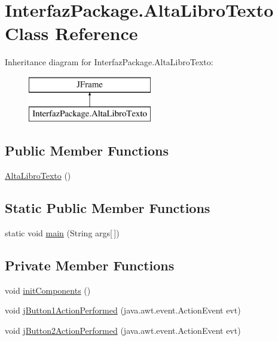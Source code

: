 \hypertarget{class_interfaz_package_1_1_alta_libro_texto}{}\section{Interfaz\+Package.\+Alta\+Libro\+Texto Class Reference}
\label{class_interfaz_package_1_1_alta_libro_texto}
Inheritance diagram for Interfaz\+Package.\+Alta\+Libro\+Texto\+:\begin{figure}[H]
\begin{center}
\leavevmode
\includegraphics[height=2.000000cm]{class_interfaz_package_1_1_alta_libro_texto}
\end{center}
\end{figure}
\subsection*{Public Member Functions}
\begin{DoxyCompactItemize}
\item 
\mbox{\hyperlink{class_interfaz_package_1_1_alta_libro_texto_a345a50ec50122a4c6b44dfb0f33a316b}{Alta\+Libro\+Texto}} ()
\end{DoxyCompactItemize}
\subsection*{Static Public Member Functions}
\begin{DoxyCompactItemize}
\item 
static void \mbox{\hyperlink{class_interfaz_package_1_1_alta_libro_texto_a9a891823797c2520bc34cb78d91e6e91}{main}} (String args\mbox{[}$\,$\mbox{]})
\end{DoxyCompactItemize}
\subsection*{Private Member Functions}
\begin{DoxyCompactItemize}
\item 
void \mbox{\hyperlink{class_interfaz_package_1_1_alta_libro_texto_ae110cce8f414eb1117fda406dc656e6c}{init\+Components}} ()
\item 
void \mbox{\hyperlink{class_interfaz_package_1_1_alta_libro_texto_a204c99e523c784bfa4c61c55bd7d005a}{j\+Button1\+Action\+Performed}} (java.\+awt.\+event.\+Action\+Event evt)
\item 
void \mbox{\hyperlink{class_interfaz_package_1_1_alta_libro_texto_a8bd7d882c4dbfeef021a5a80b6d5559b}{j\+Button2\+Action\+Performed}} (java.\+awt.\+event.\+Action\+Event evt)
\end{DoxyCompactItemize}
